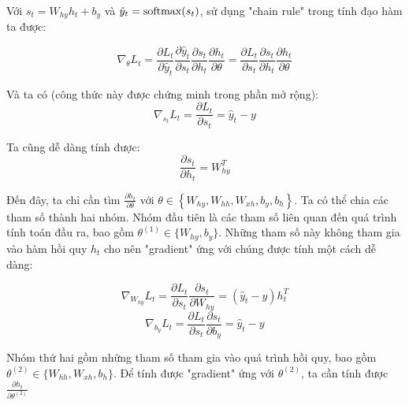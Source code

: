 Với $s_t = W_{hy} h_t + b_y$ và $\hat{y}_t = \mathrm{softmax}(s_t)$, sử dụng "chain rule" trong tính đạo hàm ta được:

\begin{equation} \label{gradientCalculating1}
\nabla_{\theta} L_t = \frac{\partial L_t}{\partial \hat{y}_t} \frac{\partial \hat{y}_t}{\partial s_t} \frac{\partial s_t}{\partial h_t} \frac{\partial h_t}{\partial \theta}  = \frac{\partial L_t}{\partial s_t} \frac{\partial s_t}{\partial h_t} \frac{\partial h_t}{\partial \theta}
\end{equation}

Và ta có (công thức này được chứng minh trong phần mở rộng):
\begin{equation} \label{gradientCalculating2}
\nabla_{s_t}L_t = \frac{\partial L_t}{\partial s_t} = \hat{y}_t - y
\end{equation}

Ta cũng dễ dàng tính được:
\begin{equation} \label{gradientCalculating3}
\frac{\partial s_t}{\partial h_t} = W_{hy}^T
\end{equation}

Đến đây, ta chỉ cần tìm $\frac{\partial h_t}{\partial \theta}$ với $\theta \in \left\{W_{hy},W_{hh},W_{xh},b_y,b_h \right \}$. Ta có thể chia các tham số thành hai nhóm. Nhóm đầu tiên là các tham số liên quan đến quá trình tính toán đầu ra, bao gồm $\theta^{(1)} \in \{W_{hy}, b_y\}$. Những tham số này không tham gia vào hàm hồi quy $h_t$ cho nên "gradient" ứng với chúng được tính một cách dễ dàng:

\begin{equation} \label{gradientCalculating4}
\nabla_{W_{hy}}L_t = \frac{\partial L_t}{\partial s_t} \frac{\partial s_t}{\partial W_{hy}}  =  (\hat{y}_t - y) h_t^T
\end{equation}
\begin{equation} \label{gradientCalculating5}
\nabla_{b_{y}}L_t = \frac{\partial L_t}{\partial s_t} \frac{\partial s_t}{\partial b_{y}}  =  \hat{y}_t - y
\end{equation}

Nhóm thứ hai gồm những tham số tham gia vào quá trình hồi quy, bao gồm $\theta^{(2)} \in \{W_{hh},W_{xh},b_h \}$. Để tính được "gradient" ứng với $\theta^{(2)}$, ta cần tính được $\frac{\partial h_t}{\partial \theta^{(2)} }$

